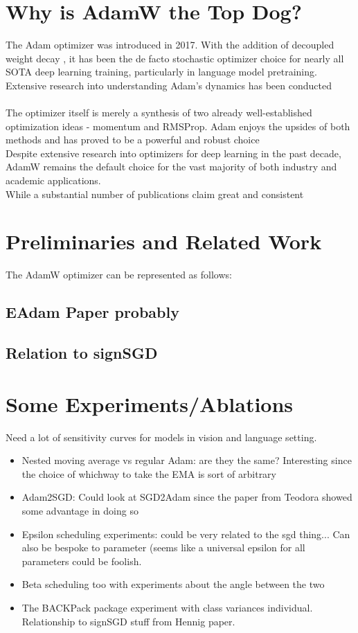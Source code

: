 \documentclass[12pt]{book}
\begin{document}
\section{Why is AdamW the Top Dog?}
The Adam optimizer \cite{kingma2017adammethodstochasticoptimization}  was introduced in 2017. With the addition of decoupled weight decay \cite{loshchilov2019decoupledweightdecayregularization}, it has been the de facto stochastic optimizer choice for nearly all SOTA deep learning training, particularly in language model pretraining. Extensive research into understanding Adam's dynamics has been conducted  \\
\\
The optimizer itself is merely a synthesis of two already well-established optimization ideas - momentum and RMSProp. Adam enjoys the upsides of both methods and has proved to be a powerful and robust choice   \\
Despite extensive research into optimizers for deep learning in the past decade, AdamW remains the default choice for the vast majority of both industry and academic applications. \\
While a substantial number of publications claim great and consistent  
\section{Preliminaries and Related Work}
The AdamW optimizer can be represented as follows: 
\subsection{EAdam Paper probably}
\subsection{Relation to signSGD}
\subsection{}
\section{Some Experiments/Ablations}
Need a lot of sensitivity curves for models in vision and language setting.
\begin{itemize}
\item Nested moving average vs regular Adam: are they the same? Interesting since the choice of whichway to take the EMA is sort of arbitrary 
\item Adam2SGD: Could look at SGD2Adam since the paper from Teodora showed some advantage in doing so
\item Epsilon scheduling experiments: could be very related to the sgd thing... Can also be bespoke to parameter (seems like a universal epsilon for all parameters could be foolish. 
\item Beta scheduling too with experiments about the angle between the two 
\item The BACKPack package experiment with class variances individual. Relationship to signSGD stuff from Hennig paper.
\end{itemize}
\end{document}
